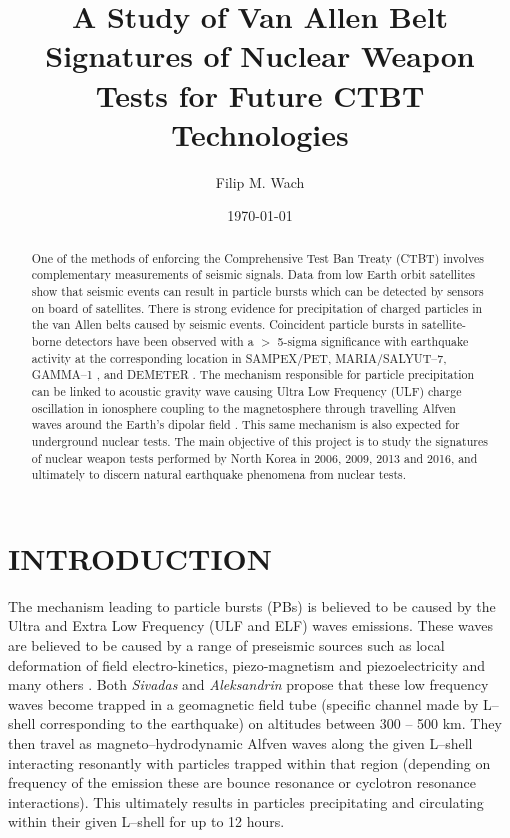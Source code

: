 \documentclass[twocolumn,prl,nobalancelastpage,aps,10pt,floatfix]{revtex4-1}
\begin{document}
 
 
\title{A Study of Van Allen Belt Signatures of Nuclear Weapon Tests for Future CTBT
Technologies} 
 
\author{Filip M. Wach} 
 
 
\begin{abstract} One of the methods of enforcing the Comprehensive Test Ban Treaty (CTBT) involves complementary measurements of seismic signals. Data from low Earth orbit satellites show that seismic events can result in particle bursts which can be detected by sensors on board of satellites.  There is strong evidence for precipitation of charged particles in the van Allen belts caused by seismic events. Coincident particle bursts in satellite-borne detectors have been observed with a $>$ 5-sigma significance with earthquake activity at the corresponding location in SAMPEX/PET, MARIA/SALYUT--7, GAMMA--1 \cite{alex}, and DEMETER \cite{dem}. The mechanism responsible for particle precipitation can be linked to acoustic gravity wave causing Ultra Low Frequency (ULF) charge oscillation in ionosphere coupling to the magnetosphere through travelling Alfven waves around the Earth's dipolar field \cite{siv}. This same mechanism is also expected for underground nuclear tests. The main objective of this project is to study the signatures of nuclear weapon tests performed by North Korea in 2006, 2009, 2013 and 2016, and ultimately to discern natural earthquake phenomena from nuclear tests.
	 
 
\end{abstract} 
\date{\today} 
 
\maketitle 
 
\section{INTRODUCTION} 
 
The mechanism leading to particle bursts (PBs) is believed to be caused by the Ultra and Extra Low Frequency (ULF and ELF) waves emissions. These waves are believed to be caused by a range of preseismic sources such as local deformation of field electro-kinetics, piezo-magnetism and piezoelectricity and many others \cite{siv}. 
Both \textit{Sivadas} and \textit{Aleksandrin} propose that these low frequency waves become trapped in a geomagnetic field tube (specific channel made by L--shell corresponding to the earthquake) on altitudes between 300 -- 500 km. They then travel as magneto--hydrodynamic Alfven waves along the given L--shell interacting resonantly with particles trapped within that region (depending on frequency of the emission these are bounce resonance or cyclotron resonance interactions). This ultimately results in particles precipitating and circulating within their given L--shell for up to 12 hours.
\end{document}
